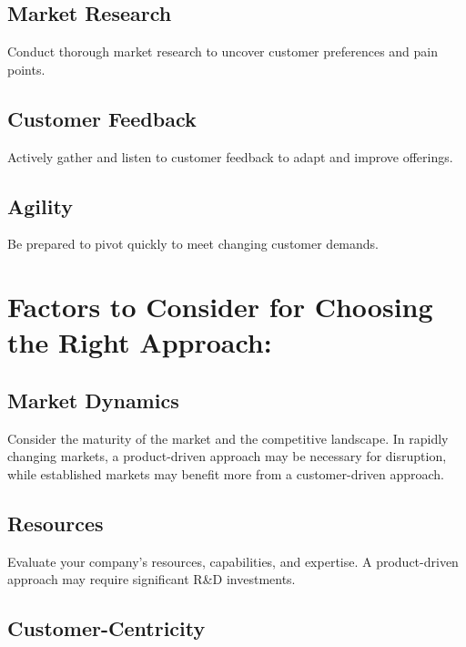\documentclass[
]{book}
\begin{document}
\hypertarget{market-research}{%
\subsection{Market Research}\label{market-research}}

Conduct thorough market research to uncover customer preferences and pain points.

\hypertarget{customer-feedback}{%
\subsection{Customer Feedback}\label{customer-feedback}}

Actively gather and listen to customer feedback to adapt and improve offerings.

\hypertarget{agility}{%
\subsection{Agility}\label{agility}}

Be prepared to pivot quickly to meet changing customer demands.

\hypertarget{factors-to-consider-for-choosing-the-right-approach}{%
\section{Factors to Consider for Choosing the Right Approach:}\label{factors-to-consider-for-choosing-the-right-approach}}

\hypertarget{market-dynamics}{%
\subsection{Market Dynamics}\label{market-dynamics}}

Consider the maturity of the market and the competitive landscape. In rapidly changing markets, a product-driven approach may be necessary for disruption, while established markets may benefit more from a customer-driven approach.

\hypertarget{resources}{%
\subsection{Resources}\label{resources}}

Evaluate your company's resources, capabilities, and expertise. A product-driven approach may require significant R\&D investments.

\hypertarget{customer-centricity}{%
\subsection{Customer-Centricity}\label{customer-centricity}}
\end{document}
